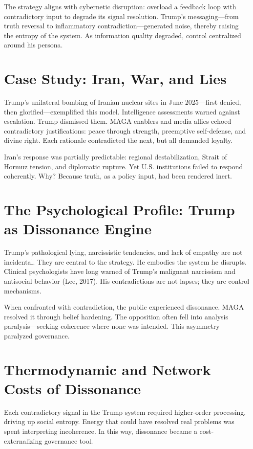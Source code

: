 The strategy aligns with cybernetic disruption: overload a feedback loop
with contradictory input to degrade its signal resolution. Trump's
messaging---from truth reversal to inflammatory
contradiction---generated noise, thereby raising the entropy of the
system. As information quality degraded, control centralized around his
persona.

\section*{Case Study: Iran, War, and Lies}

Trump's unilateral bombing of Iranian nuclear sites in June 2025---first
denied, then glorified---exemplified this model. Intelligence
assessments warned against escalation. Trump dismissed them. MAGA
enablers and media allies echoed contradictory justifications: peace
through strength, preemptive self-defense, and divine right. Each
rationale contradicted the next, but all demanded loyalty.

Iran's response was partially predictable: regional destabilization,
Strait of Hormuz tension, and diplomatic rupture. Yet U.S. institutions
failed to respond coherently. Why? Because truth, as a policy input, had
been rendered inert.

\section*{The Psychological Profile: Trump as Dissonance Engine}

Trump's pathological lying, narcissistic tendencies, and lack of empathy
are not incidental. They are central to the strategy. He embodies the
system he disrupts. Clinical psychologists have long warned of Trump's
malignant narcissism and antisocial behavior (Lee, 2017). His
contradictions are not lapses; they are control mechanisms.

When confronted with contradiction, the public experienced dissonance.
MAGA resolved it through belief hardening. The opposition often fell
into analysis paralysis---seeking coherence where none was intended.
This asymmetry paralyzed governance.

\section*{Thermodynamic and Network Costs of Dissonance}

Each contradictory signal in the Trump system required higher-order
processing, driving up social entropy. Energy that could have resolved
real problems was spent interpreting incoherence. In this way,
dissonance became a cost-externalizing governance tool.


